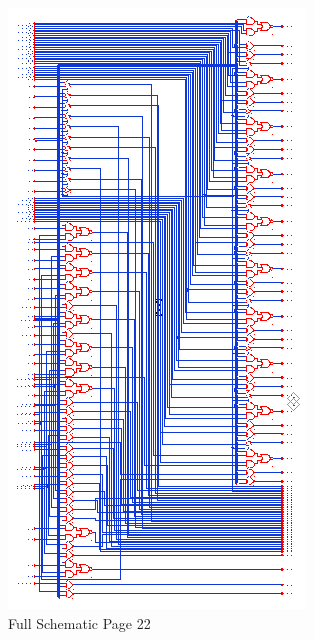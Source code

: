 \documentclass[11pt]{article}
\begin{document}
		
		\begin{figure}[H] 
			\centering 
			\includegraphics[width=\textwidth,height=\dimexpr\textheight-4\baselineskip-\abovecaptionskip-\belowcaptionskip\relax,keepaspectratio]{"Pictures/Full Schematic Page 22"}
			\caption{Full Schematic Page 22} 
			\label{fig:Full-Schematic-Page-22} 
		\end{figure}
		
\end{document}
